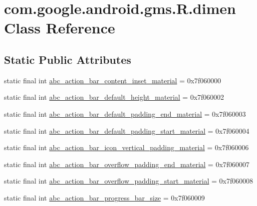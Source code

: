 \hypertarget{classcom_1_1google_1_1android_1_1gms_1_1R_1_1dimen}{}\section{com.\+google.\+android.\+gms.\+R.\+dimen Class Reference}
\label{classcom_1_1google_1_1android_1_1gms_1_1R_1_1dimen}
\subsection*{Static Public Attributes}
\begin{DoxyCompactItemize}
\item 
static final int \mbox{\hyperlink{classcom_1_1google_1_1android_1_1gms_1_1R_1_1dimen_a25af3e8fc61447421921ad5d3e792d45}{abc\+\_\+action\+\_\+bar\+\_\+content\+\_\+inset\+\_\+material}} = 0x7f060000
\item 
static final int \mbox{\hyperlink{classcom_1_1google_1_1android_1_1gms_1_1R_1_1dimen_aff398b8ff975cd56fcea0f6cc2f2fe76}{abc\+\_\+action\+\_\+bar\+\_\+default\+\_\+height\+\_\+material}} = 0x7f060002
\item 
static final int \mbox{\hyperlink{classcom_1_1google_1_1android_1_1gms_1_1R_1_1dimen_a29950102ace3f1333403e3559d7bc441}{abc\+\_\+action\+\_\+bar\+\_\+default\+\_\+padding\+\_\+end\+\_\+material}} = 0x7f060003
\item 
static final int \mbox{\hyperlink{classcom_1_1google_1_1android_1_1gms_1_1R_1_1dimen_abfef50993a427fb94b1a451e73b3765d}{abc\+\_\+action\+\_\+bar\+\_\+default\+\_\+padding\+\_\+start\+\_\+material}} = 0x7f060004
\item 
static final int \mbox{\hyperlink{classcom_1_1google_1_1android_1_1gms_1_1R_1_1dimen_a5498c61d13feea26cce2e1213b367847}{abc\+\_\+action\+\_\+bar\+\_\+icon\+\_\+vertical\+\_\+padding\+\_\+material}} = 0x7f060006
\item 
static final int \mbox{\hyperlink{classcom_1_1google_1_1android_1_1gms_1_1R_1_1dimen_a1625a3e9c2496657687ebb9551bb2e49}{abc\+\_\+action\+\_\+bar\+\_\+overflow\+\_\+padding\+\_\+end\+\_\+material}} = 0x7f060007
\item 
static final int \mbox{\hyperlink{classcom_1_1google_1_1android_1_1gms_1_1R_1_1dimen_aa3b8e0aed44da6b578c332e859ce2cb5}{abc\+\_\+action\+\_\+bar\+\_\+overflow\+\_\+padding\+\_\+start\+\_\+material}} = 0x7f060008
\item 
static final int \mbox{\hyperlink{classcom_1_1google_1_1android_1_1gms_1_1R_1_1dimen_a42975e75c014431a1e0dd5f7a70cb796}{abc\+\_\+action\+\_\+bar\+\_\+progress\+\_\+bar\+\_\+size}} = 0x7f060009

\end{DoxyCompactItemize}
